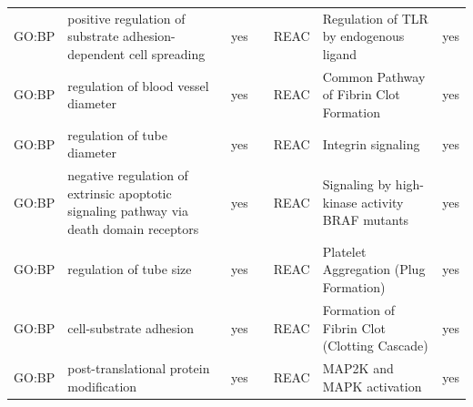 \begin{longtable}{@{}lp{5cm}lllp{5cm}l@{}}
GO:BP           & positive regulation of substrate adhesion-dependent cell spreading                      & yes              &           & REAC            & Regulation of TLR by endogenous ligand                                                                                                                                 & yes              \\
GO:BP           & regulation of blood vessel diameter                                                                                                & yes              &           & REAC            & Common Pathway of Fibrin Clot Formation                                                                                                                                & yes              \\
GO:BP           & regulation of tube diameter                                                                                                        & yes              &           & REAC            & Integrin signaling                                                                                                                                                     & yes              \\
GO:BP           & negative regulation of extrinsic apoptotic signaling pathway via death domain receptors & yes              &           & REAC            & Signaling by high-kinase activity BRAF mutants                                                                                                                         & yes              \\
GO:BP           & regulation of tube size                                                                                                            & yes              &           & REAC            & Platelet Aggregation (Plug Formation)                                                                                                                                  & yes              \\
GO:BP           & cell-substrate adhesion                                                                                                            & yes              &           & REAC            & Formation of Fibrin Clot (Clotting Cascade)                                                                                                                            & yes              \\
GO:BP           & post-translational protein modification                                                                                            & yes              &           & REAC            & MAP2K and MAPK activation                                                                                                                                              & yes              \\

\end{longtable}
